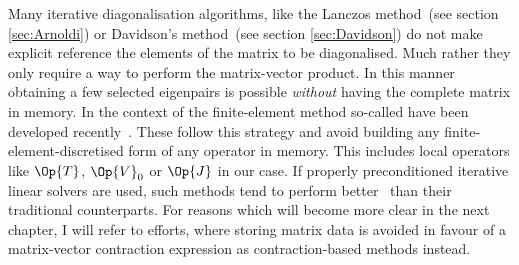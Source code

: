 Many iterative diagonalisation algorithms,
like the Lanczos method~(see section \ref{sec:Arnoldi})
or Davidson's method~(see section \ref{sec:Davidson})
do not make explicit reference the elements of the matrix to be diagonalised.
Much rather they only require a way to perform the matrix-vector product.
In this manner obtaining a few selected eigenpairs
is possible \emph{without} having the complete matrix in memory.
In the context of the finite-element method
so-called 
have been developed recently~\cite{Kronbichler2012}.
These follow this strategy and avoid
building any finite-element-discretised form of any operator in memory.
This includes local operators like $\Op{T}$, $\Op{V}_0$ or $\Op{J}$ in our case.
If properly preconditioned iterative linear solvers are used,
such methods tend to perform better~\cite{Kronbichler2012}
than their traditional counterparts.
For reasons which will become more clear in the next chapter,
I will refer to efforts,
where storing matrix data is avoided
in favour of a matrix-vector contraction expression
as contraction-based methods instead.

